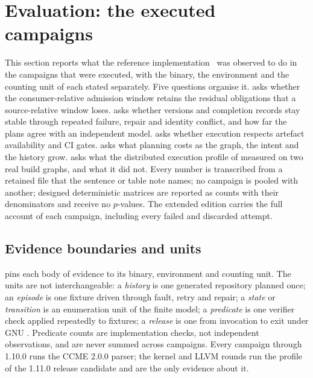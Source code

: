 \section{Evaluation: the executed campaigns}
\label{sec:evaluation}

This section reports what the reference implementation~\cite{dispat} was
observed to do in the campaigns that were executed, with the binary, the
environment and the counting unit of each stated separately. Five questions
organise it.  asks whether the consumer-relative admission window
retains the residual obligations that a source-relative window loses.
 asks whether versions and completion records stay stable through
repeated failure, repair and identity conflict, and how far the plans agree
with an independent model.  asks whether execution respects artefact
availability and CI gates.  asks what planning costs as the graph,
the intent and the history grow.  asks what the distributed execution
profile of  measured on two real build graphs, and what it did not.
Every number is transcribed from a retained file that the sentence or table
note names; no campaign is pooled with another; designed deterministic
matrices are reported as counts with their denominators and receive no
$p$-values. The extended edition carries the full account of each campaign,
including every failed and discarded attempt.

\subsection{Evidence boundaries and units}
\label{sec:eval:boundaries}

 pins each body of evidence to its binary,
environment and counting unit. The units are not interchangeable: a
\emph{history} is one generated repository planned once; an \emph{episode} is
one fixture driven through fault, retry and repair; a \emph{state} or
\emph{transition} is an enumeration unit of the finite model; a
\emph{predicate} is one verifier check applied repeatedly to fixtures; a
\emph{release} is one  from invocation to exit under GNU
. Predicate counts are implementation checks, not independent
observations, and are never summed across campaigns. Every campaign through
1.10.0 runs the CCME 2.0.0 parser; the kernel and LLVM rounds run the
 profile of the 1.11.0 release candidate and are the only evidence
about it.

